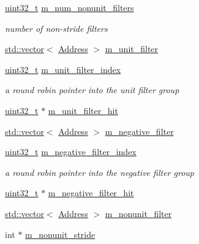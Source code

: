 \begin{DoxyCompactItemize}
\hyperlink{Type_8hh_a435d1572bf3f880d55459d9805097f62}{uint32\_\-t} \hyperlink{classPrefetcher_ad6f212487f4bbedaa6d22125da88fa04}{m\_\-num\_\-nonunit\_\-filters}
\begin{DoxyCompactList}\small\item\em number of non-\/stride filters \item\end{DoxyCompactList}\item 
\hyperlink{classstd_1_1vector}{std::vector}$<$ \hyperlink{classAddress}{Address} $>$ \hyperlink{classPrefetcher_a22e41c52e5646478755d6c2a699f2a3e}{m\_\-unit\_\-filter}
\item 
\hyperlink{Type_8hh_a435d1572bf3f880d55459d9805097f62}{uint32\_\-t} \hyperlink{classPrefetcher_aa7152e0ba18507f4499632ccffc8ddad}{m\_\-unit\_\-filter\_\-index}
\begin{DoxyCompactList}\small\item\em a round robin pointer into the unit filter group \item\end{DoxyCompactList}\item 
\hyperlink{Type_8hh_a435d1572bf3f880d55459d9805097f62}{uint32\_\-t} $\ast$ \hyperlink{classPrefetcher_adb0b4ed5c68fa291f0f0b1e5a08dd1e8}{m\_\-unit\_\-filter\_\-hit}
\item 
\hyperlink{classstd_1_1vector}{std::vector}$<$ \hyperlink{classAddress}{Address} $>$ \hyperlink{classPrefetcher_a596c08c70ae40df3eb032cbdf16db62f}{m\_\-negative\_\-filter}
\item 
\hyperlink{Type_8hh_a435d1572bf3f880d55459d9805097f62}{uint32\_\-t} \hyperlink{classPrefetcher_a515ce9fec5ecb09164d1915f41bdd881}{m\_\-negative\_\-filter\_\-index}
\begin{DoxyCompactList}\small\item\em a round robin pointer into the negative filter group \item\end{DoxyCompactList}\item 
\hyperlink{Type_8hh_a435d1572bf3f880d55459d9805097f62}{uint32\_\-t} $\ast$ \hyperlink{classPrefetcher_a634a8a03b20af61b964bf187317ff430}{m\_\-negative\_\-filter\_\-hit}
\item 
\hyperlink{classstd_1_1vector}{std::vector}$<$ \hyperlink{classAddress}{Address} $>$ \hyperlink{classPrefetcher_a561535cdda35027c698a573b6b3e5e52}{m\_\-nonunit\_\-filter}
\item 
int $\ast$ \hyperlink{classPrefetcher_ae5f5874d1f5f2ae17e490bc3e932e2bc}{m\_\-nonunit\_\-stride}

\end{DoxyCompactItemize}
